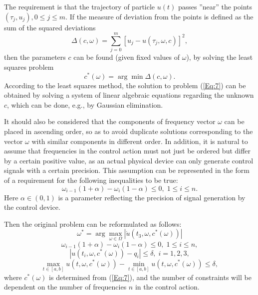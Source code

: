 \documentclass{llncs}
\begin{document}
The requirement is that the trajectory of particle $u(t)$ passes ''near'' the points  $(\tau_j,u_j), 0\leq j\leq m$. If the measure of deviation from the points is defined as the sum of the squared deviations
\[
\Delta(c,\omega)= \sum^{m}_{j=0}\left[u_j-u(\tau_j,\omega,c)\right]^2, 
\]
then the parameters $c$ can be found (given fixed values of $\omega$), by solving  the least squares problem
\begin{equation}\label{Eq:7}
c^\ast(\omega) = \arg \min\Delta(c,\omega).	
\end{equation}
According to the least squares method, the solution to problem (\ref{Eq:7}) can be obtained by solving a system of linear algebraic equations regarding the unknown $c$, which can be done, e.g., by Gaussian elimination.

It should also be considered that the components of frequency vector $\omega$ can be placed in ascending order, so as to avoid duplicate solutions corresponding to the vector $\omega$ with similar components in different order. In addition, it is natural to assume that frequencies in the control action must not just be ordered but differ by a certain positive value, as an actual physical device can only generate control signals with a certain precision. This assumption can be represented in the form of a requirement for the following inequalities to be true:
\begin{equation}\label{Eq:8}
\omega_{i-1}(1+\alpha)-\omega_i(1-\alpha)\leq 0, \; 1\leq i \leq n.	
\end{equation}
Here $\alpha\in(0,1)$ is a parameter reflecting the precision of signal generation by the control device.

Then the original problem can be reformulated as follows:
\begin{equation}\label{Eq:9}
\omega^\ast = \arg \max_{\omega \in \Omega} \left| \dot{u}(t_3,\omega,c^\ast(\omega)) \right|
\end{equation}
\[
\omega_{i-1}(1+\alpha)-\omega_i(1-\alpha)\leq 0, \; 1\leq i \leq n,
\]
\[
\left|u(t_i,\omega,c^\ast(\omega))-q_i\right|\leq\delta, \; i=1,2,3,
\]
\[
\max_{t\in[a,b]}{u(t,\omega,c^\ast(\omega))}-\min_{t\in[a,b]}{u(t,\omega,c^\ast(\omega))}\leq\delta,
\]
where $c^\ast(\omega)$ is determined from (\ref{Eq:7}), and the number of constraints will be dependent on the number of frequencies $n$ in the control action.
\end{document}
